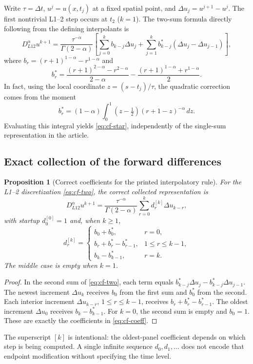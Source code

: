 \documentclass[11pt]{amsart}
\numberwithin{equation}{section}
\newtheorem{proposition}{Proposition}[section]
\theoremstyle{remark}
\begin{document}
Write $\tau=\Delta t$, $u^j=u(x,t_j)$ at a fixed spatial point, and
$\Delta u_{j}=u^{j+1}-u^j$. The first nontrivial L1--2 step occurs at $t_2$
($k=1$). The two-sum formula directly following from the defining
interpolants is
\begin{equation}\label{eq:cf-two}
D_{L12}^{\alpha}u^{k+1}=\frac{\tau^{-\alpha}}{\Gamma(2-\alpha)}
\left[\sum_{j=0}^kb_{k-j}\Delta u_{j}+
\sum_{j=1}^kb_{k-j}^*(\Delta u_{j}-\Delta u_{j-1})\right],
\end{equation}
where $b_r=(r+1)^{1-\alpha}-r^{1-\alpha}$ and
\begin{equation}\label{eq:cf-star}
b_r^*=\frac{(r+1)^{2-\alpha}-r^{2-\alpha}}{2-\alpha}
-\frac{(r+1)^{1-\alpha}+r^{1-\alpha}}2.
\end{equation}
In fact, using the local coordinate $z=(s-t_j)/\tau$, the quadratic
correction comes from the moment
\[
b_r^*=(1-\alpha)\int_0^1(z-\tfrac12)(r+1-z)^{-\alpha}\,dz.
\]
Evaluating this integral yields \eqref{eq:cf-star}, independently of the
single-sum representation in the article.

\subsection{Exact collection of the forward differences}
\begin{proposition}[Correct coefficients for the printed interpolatory rule]\label{prop:cf-collect}
For the L1--2 discretization \eqref{eq:cf-two}, the correct collected
representation is
\begin{equation}\label{eq:cf-one}
D_{L12}^{\alpha}u^{k+1}=\frac{\tau^{-\alpha}}{\Gamma(2-\alpha)}
\sum_{r=0}^kd_r^{[k]}\Delta u_{k-r},
\end{equation}
with startup $d_0^{[0]}=1$ and, when $k\geq1$,
\begin{equation}\label{eq:cf-coeff}
d_r^{[k]}=\begin{cases}
b_0+b_0^*, & r=0,\\
b_r+b_r^*-b_{r-1}^*, & 1\leq r\leq k-1,\\
b_k-b_{k-1}^*, & r=k.
\end{cases}
\end{equation}
The middle case is empty when $k=1$.
\end{proposition}
\begin{proof}
In the second sum of \eqref{eq:cf-two}, each term equals
$b_{k-j}^*\Delta u_{j}-b_{k-j}^*\Delta u_{j-1}$. The newest increment
$\Delta u_{k}$ receives $b_0$ from the first sum and $b_0^*$ from the second.
Each interior increment $\Delta u_{k-r}$, $1\leq r\leq k-1$, receives
$b_r+b_r^*-b_{r-1}^*$. The oldest increment $\Delta u_{0}$ receives
$b_k-b_{k-1}^*$. For $k=0$, the second sum is empty and $b_0=1$. These are
exactly the coefficients in \eqref{eq:cf-coeff}.
\end{proof}
The superscript $[k]$ is intentional: the oldest-panel coefficient depends
on which step is being computed. A single infinite sequence $d_0,d_1,\ldots$
does not encode that endpoint modification without specifying the time level.
\end{document}
